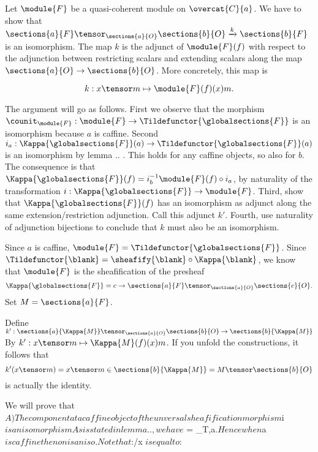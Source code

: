 Let $\module{F}$ be a quasi-coherent module on $\overcat{C}{a}$.
We have to show that $\sections{a}{F} \tensor_{\sections{a}{O}} \sections{b}{O} \xrightarrow{k} \sections{b}{F}$ is an isomorphism. 
The map $k$ is the adjunct of $\module{F}(f)$ with respect to the adjunction between restricting scalars and extending scalars along the map 
$\sections{a}{O} \rightarrow \sections{b}{O}$. 
More concretely, this map is

\[k: x \tensor m \mapsto \module{F}(f)(x)m.\]

The argument will go as follows. 
First we observe that the morphism $\counit_{\module{F}}:\module{F} \rightarrow \Tildefunctor{\globalsections{F}}$ is an isomorphism because $a$ is caffine.
Second $i_{a}:\Kappa{\globalsections{F}}(a) \rightarrow \Tildefunctor{\globalsections{F}}(a)$ is an isomorphism by lemma .. . 
This holds for any caffine objects, so also for $b$. 
The consequence is that $\Kappa{\globalsections{F}}(f) = i_b^{-1} \module{F}(f) \circ i_a$, by naturality of the transformation 
$i: \Kappa{\globalsections{F}}\rightarrow \module{F}$.
Third, show that $\Kappa{\globalsections{F}}(f)$ has an isomorphism as adjunct along the same extension/restriction adjunction. Call this adjunct $k'$.
Fourth, use naturality of adjunction bijections to conclude that $k$ must also be an isomorphism.

Since $a$ is caffine, $\module{F} = \Tildefunctor{\globalsections{F}}$.
Since $\Tildefunctor{\blank} = \sheafify{\blank} \circ \Kappa{\blank}$, we know that $\module{F}$ is the sheafification of the presheaf 
\[\Kappa{\globalsections{F}} = c \rightarrow \sections{a}{F} \tensor_{\sections{a}{O}} \sections{c}{O}.\]
Set $M = \sections{a}{F}$.

Define $k': \sections{a}{\Kappa{M}} \tensor_{\sections{a}{O}} \sections{b}{O} \rightarrow \sections{b}{\Kappa{M}}$
By $k':x \tensor m \mapsto \Kappa{M}(f)(x) m$.
If you unfold the constructions, it follows that 
\[k'(x\tensor m) = x\tensor m \in \sections{b}{\Kappa{M}} = M \tensor \sections{b}{O}\]
 is actually the identity.

We will prove that $
A) The component at a caffine object of the unversal sheafification morphism $i$ is an isomorphism
As is stated in lemma .. , we have $ = \counit_{T,a}$. 
Hence when $a$ is caffine then $$ on is an iso.
Note that $:/x \rightarrow {}$ is equal to $:  \rightarrow \



